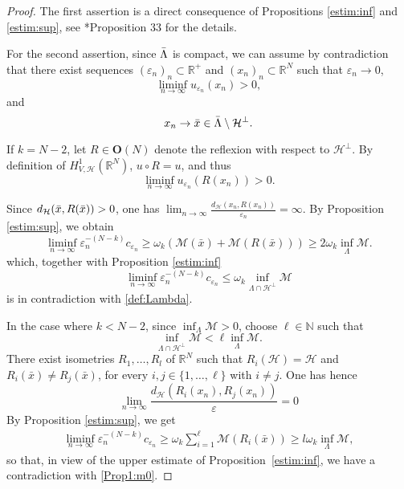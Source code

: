 \documentclass[a4paper]{amsart}
\begin{document}
\begin{proof}
The first assertion is a direct consequence of Propositions \ref{estim:inf} and \ref{estim:sup}, see \cite{BVS}*{Proposition
33} for the details.

\medbreak

For the second assertion, since $\Bar{\Lambda}$ is compact, we can assume by contradiction that there exist sequences
$(\varepsilon_n)_n \subset {\mathbb{R}}^+$ and
$(x_n)_n \subset {\mathbb{R}}^{N}$ such that $\varepsilon_n \to 0$,
\[
 \liminf_{n\to\infty} u_{\varepsilon_n}(x_n) > 0,
\]
and 
\[
  x_n \to \Bar{x} \in \Bar{\Lambda}\setminus \mathcal{H}^\perp.
\]

If $k=N-2$, let $R \in \mathbf{O}(N)$ denote the reflexion with respect to $\mathcal{H}^\perp$. By definition of $H^1_{V, \mathcal{H}}({\mathbb{R}}^N)$, $u \circ R=u$, and thus
\[
 \liminf_{n\to\infty} u_{\varepsilon_n}(R(x_n)) > 0.
\]

Since $d_{\mathcal{H}}(\Bar{x}, R(\Bar{x}))> 0$, one has $\lim_{n \to \infty} \frac{d_{\mathcal{H}}(x_n,
R(x_n))}{\varepsilon_n} = \infty$.
By Proposition \ref{estim:sup}, we obtain 
\[
 \liminf_{n\to\infty} \varepsilon_n^{-(N-k)} c_{\varepsilon_n} \geq \omega_k \left( \mathcal{M}(\bar{x}) +
\mathcal{M}(R(\bar{x})) \right) \geq 2\omega_k \inf_{\Lambda} \mathcal{M}.
\]
which, together with Proposition \ref{estim:inf}
\[
 \liminf_{n\to\infty} \varepsilon_n^{-(N-k)} c_{\varepsilon_n} \leq \omega_k \inf_{\Lambda \cap \mathcal{H}^\perp} \mathcal{M}
\]
is in contradiction with \eqref{def:Lambda}.

In the case where $k < N-2$, since $\inf_{\Lambda} \mathcal{M} > 0$, choose $\ell \in {\mathbb{N}}$ such that 
\begin{equation}
\label{Prop1:m0}
  \inf_{\Lambda \cap \mathcal{H}^\perp} \mathcal{M} < \ell\inf_{\Lambda} \mathcal{M}.
\end{equation}
There exist isometries $R_1, \dots, R_l$ of ${\mathbb{R}}^N$ such that $R_{i}(\mathcal{H})=\mathcal{H}$ and $R_i(\bar{x})
\neq R_j(\bar{x})$, for every $i,j \in \{1, \dots, \ell\}$ with $i \ne j$. One has hence 
\[
  \lim_{n \to \infty} \frac{d_{\mathcal{H}}(R_i(x_n), R_j(x_n))}{\varepsilon}=0
\]
By Proposition \ref{estim:sup}, we get
\begin{align*}
 \liminf_{n\to\infty} \varepsilon_n^{-(N-k)} c_{\varepsilon_n} \geq \omega_k \sum_{i=1}^{\ell} \mathcal{M}(R_i(\bar{x}))  \geq
l\omega_k \inf_{\Lambda} \mathcal{M},
\end{align*}
so that, in view of the upper estimate of Proposition~\ref{estim:inf}, we have a contradiction with \eqref{Prop1:m0}.


\end{proof}
\end{document}
